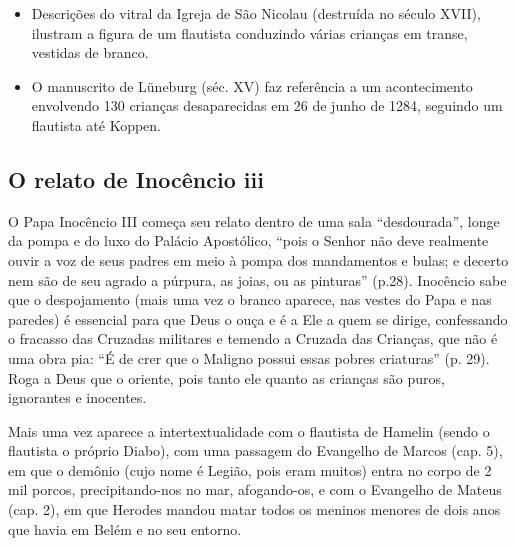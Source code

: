 \documentclass[12pt]{extarticle}
\begin{document}
\begin{quote}

\end{quote}

\begin{itemize}
\item
  Descrições do vitral da Igreja de São Nicolau (destruída no século
  XVII), ilustram a figura de um flautista conduzindo várias crianças em
  transe, vestidas de branco.
\end{itemize}

\begin{itemize}
\item
  O manuscrito de Lüneburg (séc. XV) faz referência a um acontecimento
  envolvendo 130 crianças desaparecidas em 26 de junho de 1284, seguindo
  um flautista até Koppen.
\end{itemize}

\subsection{O relato de Inocêncio iii}

O Papa Inocêncio III começa seu relato dentro de uma sala
``desdourada'', longe da pompa e do luxo do Palácio Apostólico, ``pois o
Senhor não deve realmente ouvir a voz de seus padres em meio à pompa dos
mandamentos e bulas; e decerto nem são de seu agrado a púrpura, as
joias, ou as pinturas'' (p.28). Inocêncio sabe que o despojamento (mais
uma vez o branco aparece, nas vestes do Papa e nas paredes) é essencial
para que Deus o ouça e é a Ele a quem se dirige, confessando o fracasso
das Cruzadas militares e temendo a Cruzada das Crianças, que não é uma
obra pia: ``É de crer que o Maligno possui essas pobres criaturas'' (p.
29). Roga a Deus que o oriente, pois tanto ele quanto as crianças são
puros, ignorantes e inocentes.




Mais uma vez aparece a intertextualidade com o flautista de Hamelin
(sendo o flautista o próprio Diabo), com uma passagem do Evangelho de
Marcos (cap. 5), em que o demônio (cujo nome é Legião, pois eram muitos)
entra no corpo de 2 mil porcos, precipitando-nos no mar, afogando-os, e
com o Evangelho de Mateus (cap. 2), em que Herodes mandou matar todos os
meninos menores de dois anos que havia em Belém e no seu entorno.
\end{document}

